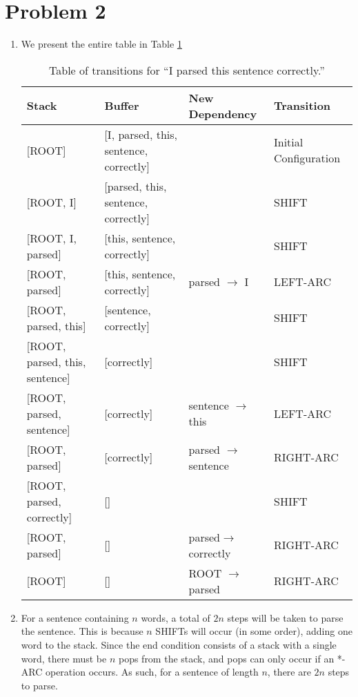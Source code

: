 \documentclass[12pt]{article}
\begin{document}
\section*{Problem 2}
\begin{enumerate}[label=(\alph*)]
  \item We present the entire table in Table \ref{table:parsing}
    \begin{table}[h!]
    \centering
    \begin{tabular}{l|l|l|l}
    Stack                              & Buffer                                     & New Dependency                & Transition            \\ \hline
    {[}ROOT{]}                         & {[}I, parsed, this, sentence, correctly{]} &                               & Initial Configuration \\
    {[}ROOT, I{]}                      & {[}parsed, this, sentence, correctly{]}    &                               & SHIFT                 \\
    {[}ROOT, I, parsed{]}              & {[}this, sentence, correctly{]}            &                               & SHIFT                 \\
    {[}ROOT, parsed{]}                 & {[}this, sentence, correctly{]}            & parsed $\rightarrow$ I        & LEFT-ARC              \\
    {[}ROOT, parsed, this{]}           & {[}sentence, correctly{]}                  &                               & SHIFT                 \\
    {[}ROOT, parsed, this, sentence{]} & {[}correctly{]}                            &                               & SHIFT                 \\
    {[}ROOT, parsed, sentence{]}       & {[}correctly{]}                            & sentence $\rightarrow$ this   & LEFT-ARC              \\
    {[}ROOT, parsed{]}                 & {[}correctly{]}                            & parsed $\rightarrow$ sentence & RIGHT-ARC             \\
    {[}ROOT, parsed, correctly{]}      & {[}{]}                                     &                               & SHIFT                 \\
    {[}ROOT, parsed{]}                 & {[}{]}                                     & parsed$\rightarrow$ correctly & RIGHT-ARC             \\
    {[}ROOT{]}                         & {[}{]}                                     & ROOT $\rightarrow$ parsed     & RIGHT-ARC            
    \end{tabular}
    \caption{Table of transitions for ``I parsed this sentence correctly.''}
    \label{table:parsing}
    \end{table}
  \item For a sentence containing $n$ words, a total of $2n$ steps will be taken to parse the sentence. This is because $n$ SHIFTs will occur (in some order), adding one word to the stack. Since the end condition consists of a stack with a single word, there must be $n$ pops from the stack, and pops can only occur if an *-ARC operation occurs. As such, for a sentence of length $n$, there are $2n$ steps to parse.
\end{enumerate}
\end{document}
